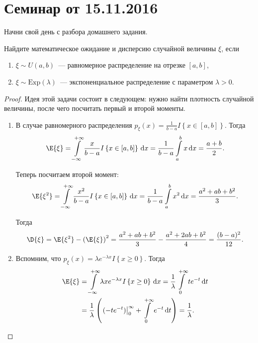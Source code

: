 \section{Семинар от 15.11.2016}
Начни свой день с разбора домашнего задания.
\begin{problem}
	Найдите математическое ожидание и дисперсию случайной величины \(\xi\), если
	\begin{enumerate}
		\item \(\xi \sim U(a, b)\)~--- равномерное распределение на отрезке \([a, b]\),
		\item \(\xi \sim \mathrm{Exp}(\lambda)\)~--- экспоненциальное распределение с параметром \(\lambda > 0\).
	\end{enumerate}
\end{problem}
\begin{proof}
	Идея этой задачи состоит в следующем: нужно найти плотность случайной величины, после чего посчитать первый и второй моменты.
	\begin{enumerate}
		\item В случае равномерного распределения \(p_{\xi}(x) = \frac{1}{b - a}I\left\{x \in [a, b]\right\}\). Тогда
		\begin{align}
			\E{\xi} = \int\limits_{-\infty}^{+\infty} \frac{x}{b - a}I\left\{x \in [a, b]\right\}\,\mathrm{d}x = \frac{1}{b - a}\int\limits_{a}^{b} x\,\mathrm{d}x = \frac{a + b}{2}.
		\end{align}
		
		Теперь посчитаем второй момент:
		\begin{align}
			\E{\xi^2} = \int\limits_{-\infty}^{+\infty} \frac{x^2}{b - a}I\left\{x \in [a, b]\right\}\,\mathrm{d}x = \frac{1}{b - a}\int\limits_{a}^{b} x^2\,\mathrm{d}x = \frac{a^2 + ab + b^2}{3}.
		\end{align}
		
		Тогда
		\begin{align}
			\D{\xi} = \E{\xi^2} - \left(\E{\xi}\right)^2 = \frac{a^2 + ab + b^2}{3} - \frac{a^2 + 2ab + b^2}{4} = \frac{(b - a)^2}{12}.
		\end{align}
		
		\item Вспомним, что \(p_{\xi}(x) = \lambda e^{-\lambda x}I\left\{x \geq 0\right\}\). Тогда
		\begin{align}
			\E{\xi} &= \int\limits_{-\infty}^{+\infty} \lambda x e^{-\lambda x}I\left\{x \geq 0\right\}\,\mathrm{d}x = \frac{1}{\lambda}\int\limits_{0}^{+\infty} te^{-t}\,\mathrm{d}t \\ 
			&= \frac{1}{\lambda}\left(\left.(-te^{-t})\right|_{0}^{\infty} + \int\limits_{0}^{+\infty} e^{-t}\,\mathrm{d}t\right) = \frac{1}{\lambda}.
		\end{align}
		

\end{enumerate}
\end{proof}
